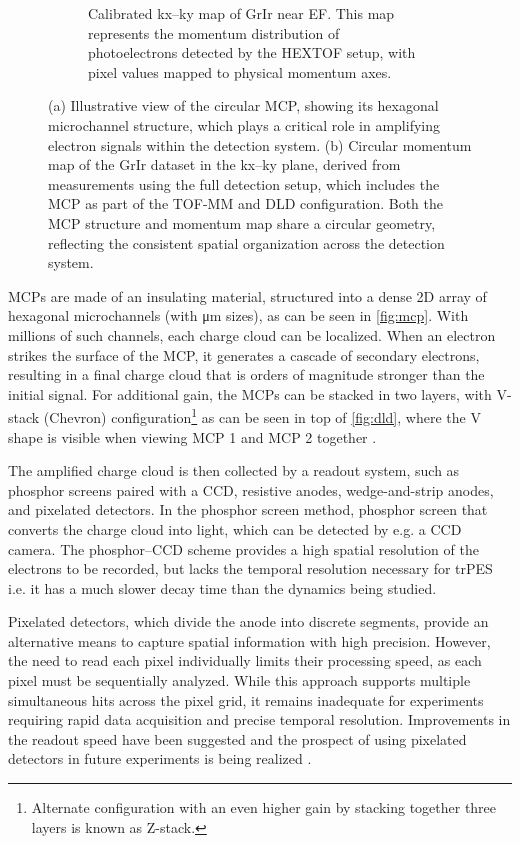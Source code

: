 \begin{figure}[h]
\begin{subfigure}[t]{0.49\linewidth}
        \caption{Calibrated \gls{kx}--\gls{ky} map of \gls{GrIr} near \gls{EF}. This map represents the momentum distribution of photoelectrons detected by the \gls{HEXTOF} setup, with pixel values mapped to physical momentum axes.}
        \label{fig:grir-2d-slice-calibrated}
    \end{subfigure}
    \caption{(a) Illustrative view of the circular \gls{MCP}, showing its hexagonal microchannel structure, which plays a critical role in amplifying electron signals within the detection system. (b) Circular momentum map of the \gls{GrIr} dataset in the \gls{kx}--\gls{ky} plane, derived from measurements using the full detection setup, which includes the \gls{MCP} as part of the \gls{TOF}-\gls{MM} and \gls{DLD} configuration. Both the MCP structure and momentum map share a circular geometry, reflecting the consistent spatial organization across the detection system.}
    \label{fig:combined-figures}
\end{figure}

\Glspl{MCP} are made of an insulating material, structured into a dense 2D array of hexagonal microchannels (with \unit{\micro\meter} sizes), as can be seen in \cref{fig:mcp}. With millions of such channels, each charge cloud can be localized. When an electron strikes the surface of the \gls{MCP}, it generates a cascade of secondary electrons, resulting in a final charge cloud that is orders of magnitude stronger than the initial signal. For additional gain, the \glspl{MCP} can be stacked in two layers, with V-stack (Chevron) configuration\footnote{Alternate configuration with an even higher gain by stacking together three layers is known as Z-stack.}
as can be seen in top of \cref{fig:dld}, where the V shape is visible when viewing MCP 1 and MCP 2 together \cite{ladislaswizaMicrochannelPlateDetectors1979,paschottaMicrochannelPlatesEncyclopedia2019}. 

The amplified charge cloud is then collected by a readout system, such as  phosphor screens paired with a \gls{CCD}, resistive anodes, wedge-and-strip anodes, and pixelated detectors. In the phosphor screen method, phosphor screen that converts the charge cloud into light, which can be detected by e.g. a \gls{CCD} camera. The phosphor--\gls{CCD} scheme provides a high spatial resolution of the electrons to be recorded, but lacks the temporal resolution necessary for \gls{trPES} i.e. it has a much slower decay time than the dynamics being studied.

Pixelated detectors, which divide the anode into discrete segments, provide an alternative means to capture spatial information with high precision. However, the need to read each pixel individually limits their processing speed, as each pixel must be sequentially analyzed. While this approach supports multiple simultaneous hits across the pixel grid, it remains inadequate for experiments requiring rapid data acquisition and precise temporal resolution. Improvements in the readout speed have been suggested and the prospect of using pixelated detectors in future experiments is being realized .

